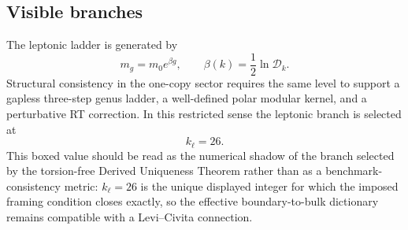 \documentclass[11pt]{article}
\newcommand{\cD}{\mathcal{D}}
\begin{document}
\subsection{Visible branches}

The leptonic ladder is generated by
\begin{equation}
 m_g = m_0e^{\beta g},
 \qquad
 \beta(k)=\frac12\ln\cD_k.
\end{equation}
Structural consistency in the one-copy sector requires the same level to support a gapless three-step genus ladder, a well-defined polar modular kernel, and a perturbative RT correction. In this restricted sense the leptonic branch is selected at
\begin{equation}
 \boxed{k_{\ell}=26.}
\end{equation}
This boxed value should be read as the numerical shadow of the branch selected by the torsion-free Derived Uniqueness Theorem rather than as a benchmark-consistency metric: $k_{\ell}=26$ is the unique displayed integer for which the imposed framing condition closes exactly, so the effective boundary-to-bulk dictionary remains compatible with a Levi--Civita connection.
\end{document}
